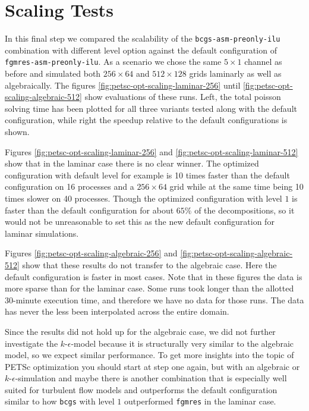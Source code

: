 \section{Scaling Tests}

In this final step we compared the scalability of the
\texttt{bcgs-asm-preonly-ilu} combination with different level option against
the default configuration of \texttt{fgmres-asm-preonly-ilu}. As a scenario we
chose the same $5 \times 1$ channel as before and simulated both $256 \times 64$
and $512 \times 128$ grids laminarly as well as algebraically. The figures
\ref{fig:petsc-opt-scaling-laminar-256} until
\ref{fig:petsc-opt-scaling-algebraic-512} show evaluations of these runs. Left,
the total poisson solving time has been plotted for all three variants tested
along with the default configuration, while right the speedup relative to the
default configurations is shown.

Figures \ref{fig:petsc-opt-scaling-laminar-256} and
\ref{fig:petsc-opt-scaling-laminar-512} show that in the laminar case there is
no clear winner. The optimized configuration with default level for example is
10 times faster than the default configuration on 16 processes and a
$256 \times 64$ grid while at the same time being 10 times slower on 40
processes. Though the optimized configuration with level $1$ is faster than the
default configuration for about $65\%$ of the decompositions, so it would not be
unreasonable to set this as the new default configuration for laminar
simulations.

Figures \ref{fig:petsc-opt-scaling-algebraic-256} and
\ref{fig:petsc-opt-scaling-algebraic-512} show that these results do not
transfer to the algebraic case. Here the default configuration is faster in most
cases. Note that in these figures the data is more sparse than for the laminar
case. Some runs took longer than the allotted 30-minute execution time, and
therefore we have no data for those runs. The data has never the less been
interpolated across the entire domain.

Since the results did not hold up for the algebraic case, we did not further
investigate the $k$-$\epsilon$-model because it is structurally very similar to
the algebraic model, so we expect similar performance. To get more insights into
the topic of PETSc optimization you should start at step one again, but with an
algebraic or $k$-$\epsilon$-simulation and maybe there is another combination
that is especially well suited for turbulent flow models and outperforms the
default configuration similar to how \texttt{bcgs} with level $1$ outperformed
\texttt{fgmres} in the laminar case.

